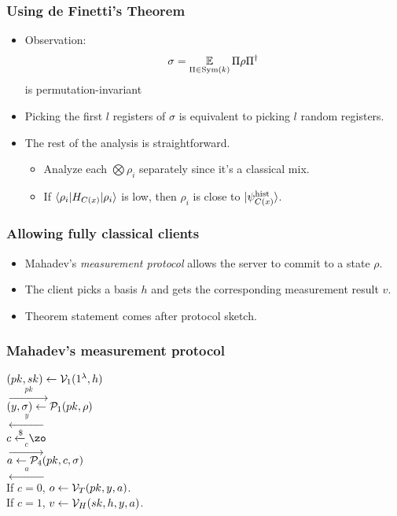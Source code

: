 \documentclass{beamer}
\begin{document}
\begin{frame}
	\frametitle{Using de Finetti's Theorem}
	\begin{itemize}[<+->]
		\item Observation: $$\sigma=\operatorname*{\mathbb{E}}_{\Pi\in\operatorname{Sym}(k)}\Pi\rho\Pi^\dag$$ is permutation-invariant
		\item Picking the first $l$ registers of $\sigma$ is equivalent to picking $l$ random registers.
		\item The rest of the analysis is straightforward.
			\begin{itemize}[<+->]
				\item Analyze each $\bigotimes\rho_i$ separately since it's a classical mix.
				\item If $\braket{\rho_i|H_{C(x)}|\rho_i}$ is low, then $\rho_i$ is close to $\ket{\psi_{C(x)}^{\mathrm{hist}}}$.
			\end{itemize}
	\end{itemize}
\end{frame}

\begin{frame}
	\frametitle{Allowing fully classical clients}
	\begin{itemize}[<+->]
		\item Mahadev's \emph{measurement protocol} allows the server to commit to a state $\rho$.
		\item The client picks a basis $h$ and gets the corresponding measurement result $v$.
		\item Theorem statement comes after protocol sketch.
	\end{itemize}
\end{frame}

\begin{frame}
	\frametitle{Mahadev's measurement protocol}
	$(pk, sk)\leftarrow\mathcal{V}_1(1^\lambda, h)$
	\pause
	\\\hspace*{\fill}$\xrightarrow{\qquad pk\qquad}$\hspace*{\fill}
	\pause
	\\\hspace*{\fill}$(y, \sigma)\leftarrow\mathcal{P}_1(pk, \rho)$
	\pause
	\\\hspace*{\fill}$\xleftarrow{\qquad y\qquad}$\hspace*{\fill}
	\pause
	\\$c\xleftarrow{\$}\zo$
	\pause
	\\\hspace*{\fill}$\xrightarrow{\qquad c\qquad}$\hspace*{\fill}
	\pause
	\\\hspace*{\fill}$a\leftarrow\mathcal{P}_4(pk, c, \sigma)$
	\pause
	\\\hspace*{\fill}$\xleftarrow{\qquad a\qquad}$\hspace*{\fill}
	\pause
	\\If $c=0$, $o\leftarrow\mathcal{V}_T(pk, y, a)$.
	\pause
	\\If $c=1$, $v\leftarrow\mathcal{V}_H(sk, h, y, a)$.
\end{frame}
\end{document}
